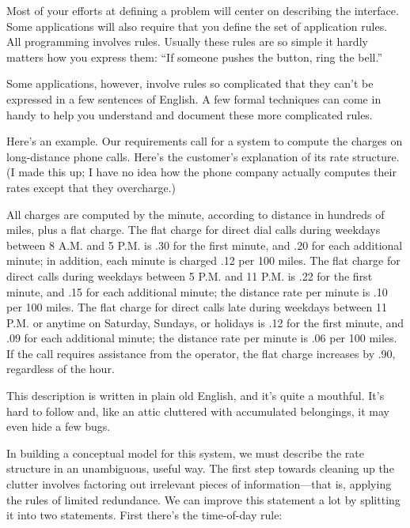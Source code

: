 Most of your efforts at defining a problem will center on describing
the interface.%
Some applications will also require that you define the set of
application rules.  All programming involves rules. Usually these
rules are so simple it hardly matters how you express them: ``If
someone pushes the button, ring the bell.''

Some applications, however, involve rules so complicated that they
can't be expressed in a few sentences of English. A few formal techniques
can come in handy to help you understand and document these more
complicated rules.

Here's an example. Our requirements call for a system to compute the
charges on long-distance phone calls. Here's the customer's
explanation of its rate structure. (I made this up; I have no idea how
the phone company actually computes their rates except that they
overcharge.)

\begin{tfquot}
All charges are computed by the minute, according to distance in
hundreds of miles, plus a flat charge. The flat charge for direct dial
calls during weekdays between 8 A.M. and 5 P.M. is .30 for the first
minute, and .20 for each additional minute; in addition, each minute
is charged .12 per 100 miles. The flat charge for direct calls during
weekdays between 5 P.M. and 11 P.M. is .22 for the first minute, and
.15 for each additional minute; the distance rate per minute is .10
per 100 miles. The flat charge for direct calls late during weekdays
between 11 P.M. or anytime on Saturday, Sundays, or holidays is .12
for the first minute, and .09 for each additional minute; the distance
rate per minute is .06 per 100 miles. If the call requires assistance
from the operator, the flat charge increases by .90, regardless of the hour.
\end{tfquot}
This description is written in plain old English, and it's quite a
mouthful.  It's hard to follow and, like an attic cluttered with
accumulated belongings, it may even hide a few bugs.

In building a conceptual model for this system, we must describe the
rate structure in an unambiguous, useful way. The first step towards
cleaning up the clutter involves factoring out irrelevant pieces of
information---that is, applying the rules of limited redundance. We
can improve this statement a lot by splitting it into two statements.
First there's the time-of-day rule:%

